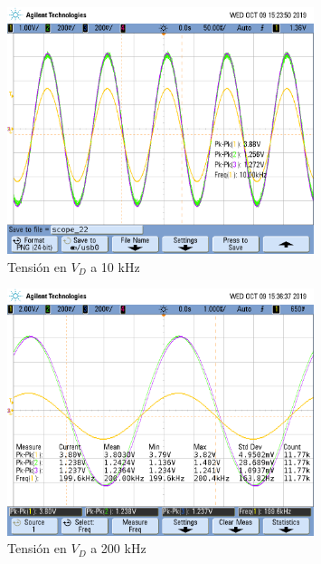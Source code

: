 \begin{figure}[H]
\centering
\includegraphics[width=0.8\textwidth,trim={0 3.45cm 0.1cm 1.75cm},clip]{Mediciones/Tensiones_10_KHz}
\caption{Tensión en $V_D$ a 10 kHz}
\label{fig:Tensiones_10_KHz}
\end{figure}

\begin{figure}[H]
\centering
\includegraphics[width=0.8\textwidth,trim={0 3.45cm 0.1cm 1.75cm},clip]{Mediciones/Tensiones_200_KHz}
\caption{Tensión en $V_D$ a 200 kHz}
\label{fig:Tensiones_200_KHz}
\end{figure}

